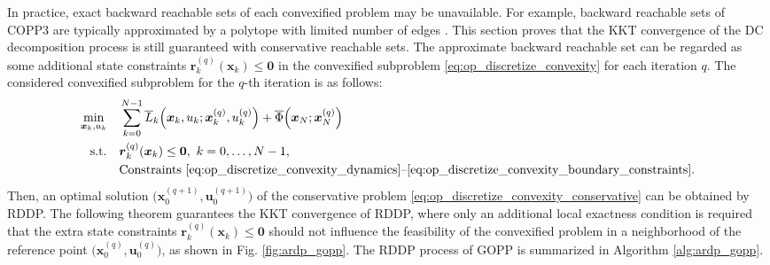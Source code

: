 \documentclass[journal]{IEEEtran}
\theoremstyle{definition}
\theoremstyle{definition}
\newcommand\st{{\text{s.t.}}}
\renewcommand\vector[1]{\boldsymbol{#1}}
\newcommand\vr{{\vector{r}}}
\newcommand\vx{{\vector{x}}}
\newcommand\vzero{{\vector{0}}}
\newcommand\bx{{\mathbf{x}}}
\newcommand\bu{{\mathbf{u}}}
\begin{document}
In practice, exact backward reachable sets of each convexified problem may be unavailable. For example, backward reachable sets of COPP3 are typically approximated by a polytope with limited number of edges \cite{dio2025time}. This section proves that the KKT convergence of the DC decomposition process is still guaranteed with conservative reachable sets. The approximate backward reachable set can be regarded as some additional state constraints $\vr^{(q)}_k(\vx_k)\leq \vzero$ in the convexified subproblem \eqref{eq:op_discretize_convexity} for each iteration $q$. The considered convexified subproblem for the $q$-th iteration is as follows:
\begin{subequations}\label{eq:op_discretize_convexity_conservative}
    \begin{align}
        \min_{\vx_k,u_k} \quad &\sum_{k=0}^{N-1} \overline{L}_k\Big(\vx_k, u_k; \vx_k^{(q)},u_k^{(q)}\Big) + \overline{\Phi}\Big(\vx_N;\vx_N^{(q)}\Big)\label{eq:op_discretize_convexity_conservative_objective}\\
        \st \quad & \vr^{(q)}_k(\vx_k)\leq \vzero,\,\,k=0,\ldots,N-1,\label{eq:op_discretize_convexity_conservative_additional_constraints}\\
        & \text{Constraints \eqref{eq:op_discretize_convexity_dynamics}--\eqref{eq:op_discretize_convexity_boundary_constraints}}.\label{eq:op_discretize_convexity_conservative_other_constraints}
    \end{align}
\end{subequations}
Then, an optimal solution $\Big(\bx_0^{(q+1)},\bu_0^{(q+1)}\Big)$ of the conservative problem \eqref{eq:op_discretize_convexity_conservative} can be obtained by RDDP. The following theorem guarantees the KKT convergence of RDDP, where only an additional local exactness condition is required that the extra state constraints $\vr^{(q)}_k(\vx_k)\leq \vzero$ should not influence the feasibility of the convexified problem in a neighborhood of the reference point $\Big(\bx_0^{(q)},\bu_0^{(q)}\Big)$, as shown in Fig. \ref{fig:ardp_gopp}. The RDDP process of GOPP is summarized in Algorithm \ref{alg:ardp_gopp}.
\end{document}
